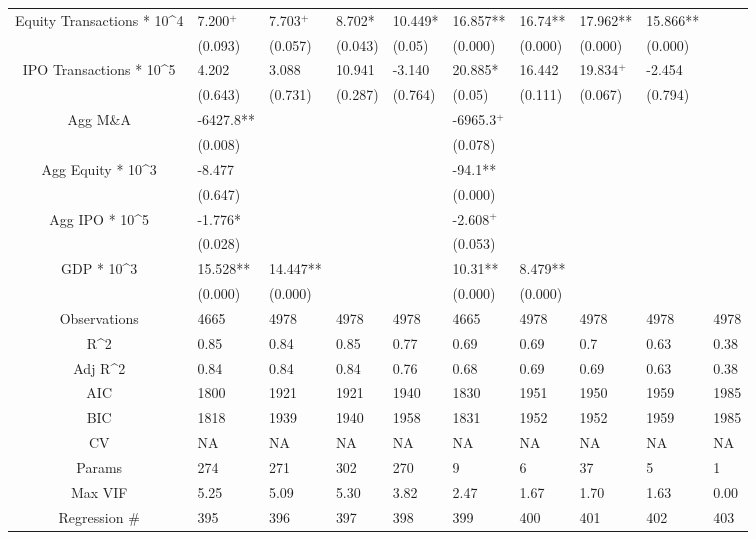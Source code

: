 \documentclass{article}
\begin{document}
\begin{table}[H]
\begin{tabular}{|clllllllll|}
  Equity Transactions * 10^4 & 7.200$^{+}$ & 7.703$^{+}$ & 8.702* & 10.449* & 16.857** & 16.74** & 17.962** & 15.866** &  \\
   & (0.093) & (0.057) & (0.043) & (0.05) & (0.000) & (0.000) & (0.000) & (0.000) &  \\
  IPO Transactions * 10^5 & 4.202 & 3.088 & 10.941 & -3.140 & 20.885* & 16.442 & 19.834$^{+}$ & -2.454 &  \\
   & (0.643) & (0.731) & (0.287) & (0.764) & (0.05) & (0.111) & (0.067) & (0.794) &  \\
  Agg M\&A & -6427.8** &  &  &  & -6965.3$^{+}$ &  &  &  &  \\
   & (0.008) &  &  &  & (0.078) &  &  &  &  \\
  Agg Equity * 10^3 & -8.477 &  &  &  & -94.1** &  &  &  &  \\
   & (0.647) &  &  &  & (0.000) &  &  &  &  \\
  Agg IPO * 10^5 & -1.776* &  &  &  & -2.608$^{+}$ &  &  &  &  \\
   & (0.028) &  &  &  & (0.053) &  &  &  &  \\
  GDP * 10^3 & 15.528** & 14.447** &  &  & 10.31** & 8.479** &  &  &  \\
   & (0.000) & (0.000) &  &  & (0.000) & (0.000) &  &  &  \\
  \hline
 Observations & 4665 & 4978 & 4978 & 4978 & 4665 & 4978 & 4978 & 4978 & 4978 \\
  R^2 & 0.85 & 0.84 & 0.85 & 0.77 & 0.69 & 0.69 & 0.7 & 0.63 & 0.38 \\
  Adj R^2 & 0.84 & 0.84 & 0.84 & 0.76 & 0.68 & 0.69 & 0.69 & 0.63 & 0.38 \\
  AIC & 1800 & 1921 & 1921 & 1940 & 1830 & 1951 & 1950 & 1959 & 1985 \\
  BIC & 1818 & 1939 & 1940 & 1958 & 1831 & 1952 & 1952 & 1959 & 1985 \\
  CV & NA & NA & NA & NA & NA & NA & NA & NA & NA \\
  Params & 274 & 271 & 302 & 270 & 9 & 6 & 37 & 5 & 1 \\
  Max VIF & 5.25 & 5.09 & 5.30 & 3.82 & 2.47 & 1.67 & 1.70 & 1.63 & 0.00 \\
  Regression \# & 395 & 396 & 397 & 398 & 399 & 400 & 401 & 402 & 403 \\
   \hline
\end{tabular}

\end{table}
\end{document}
